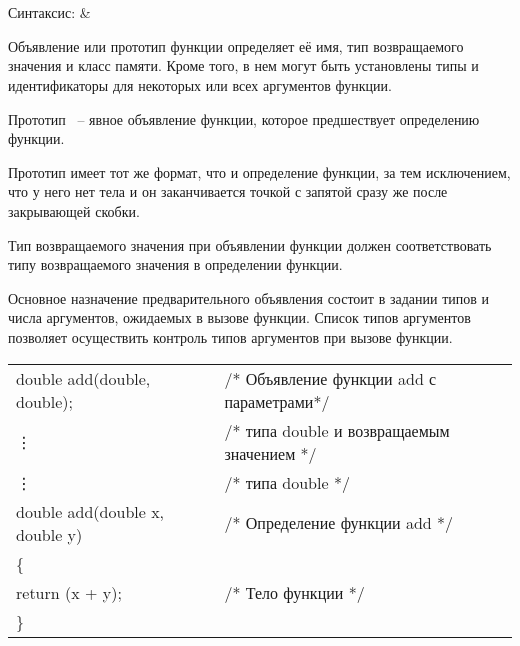 \section{}

\begin{pHeader}
Синтаксис:      & \\                   
\end{pHeader}

Объявление или прототип функции определяет её имя, тип возвращаемого значения и класс памяти. Кроме того, в нем могут быть установлены типы и идентификаторы для некоторых или всех аргументов функции. \killoverfullbefore

Прототип ~-- явное объявление функции, которое предшествует определению функции. \killoverfullbefore

Прототип имеет тот же формат, что и определение функции, за тем исключением, что у него нет тела и он заканчивается точкой с запятой сразу же после закрывающей  скобки.\killoverfullbefore

Тип возвращаемого значения при объявлении функции должен соответствовать типу возвращаемого значения в определении функции. \killoverfullbefore

Основное назначение предварительного объявления состоит в задании типов и числа аргументов, ожидаемых в вызове функции. Список типов аргументов позволяет осуществить контроль типов аргументов при вызове функции. \killoverfullbefore \BL

\begin{pExample}
\begin{tabular}{ l l }
double add(double, double);  & \textcolor{exComm}{/* Объявление функции  add с параметрами*/}  \\ 
\vdots & \textcolor{exComm}{/* типа double и возвращаемым значением */}  \\
\vdots & \textcolor{exComm}{/* типа double */} \\
double add(double x, double y) & \textcolor{exComm}{/* Определение функции add */} \\
\{ & \textcolor{exComm}{} \\
\indent return (x + y); & \textcolor{exComm}{/* Тело функции */} \\
\} & \textcolor{exComm}{} \\
\end{tabular}
\end{pExample}

